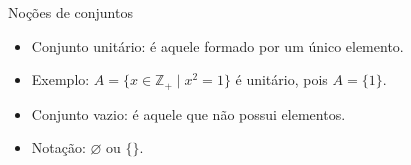 \documentclass[14pt, aspectratio=169]{beamer}
\newcommand{\Z}{\mathbb{Z}}
\begin{document}
\begin{frame}[allowframebreaks]{Noções de conjuntos}

\begin{itemize}
    \item Conjunto unitário: é aquele formado por um único elemento. 
    
    \item Exemplo: $A = \{ x \in \Z_+ \mid x^2 = 1 \}$ é unitário, pois $A = \{ 1 \}$.

    \vspace{5.0cm}

    \item Conjunto vazio: é aquele que não possui elementos.
    
    \item Notação: $\varnothing$ ou $\{ \}$.
\end{itemize}

\end{frame}
\end{document}
